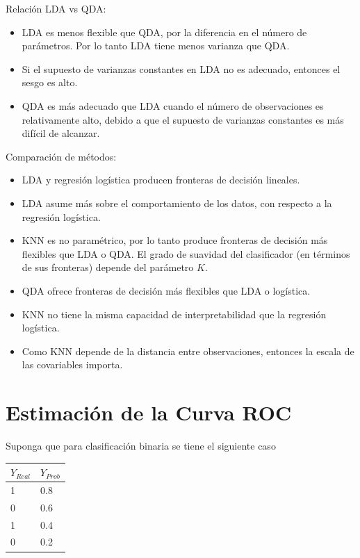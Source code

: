 \documentclass[
  12pt,
]{book}
\providecommand{\tightlist}{%
  \setlength{\itemsep}{0pt}\setlength{\parskip}{0pt}}
\begin{document}
Relación LDA vs QDA:

\begin{itemize}
\tightlist
\item
  LDA es menos flexible que QDA, por la diferencia en el número de
  parámetros. Por lo tanto LDA tiene menos varianza que QDA.
\item
  Si el supuesto de varianzas constantes en LDA no es adecuado, entonces
  el sesgo es alto.
\item
  QDA es más adecuado que LDA cuando el número de observaciones es
  relativamente alto, debido a que el supuesto de varianzas constantes
  es más difícil de alcanzar.
\end{itemize}

Comparación de métodos:

\begin{itemize}
\tightlist
\item
  LDA y regresión logística producen fronteras de decisión lineales.
\item
  LDA asume más sobre el comportamiento de los datos, con respecto a la
  regresión logística.
\item
  KNN es no paramétrico, por lo tanto produce fronteras de decisión más
  flexibles que LDA o QDA. El grado de suavidad del clasificador (en
  términos de sus fronteras) depende del parámetro \(K\).
\item
  QDA ofrece fronteras de decisión más flexibles que LDA o logística.
\item
  KNN no tiene la misma capacidad de interpretabilidad que la regresión
  logística.
\item
  Como KNN depende de la distancia entre observaciones, entonces la
  escala de las covariables importa.
\end{itemize}

\hypertarget{estimaciuxf3n-de-la-curva-roc}{%
\section{Estimación de la Curva
ROC}\label{estimaciuxf3n-de-la-curva-roc}}

Suponga que para clasificación binaria se tiene el siguiente caso

\begin{longtable}[]{@{}ll@{}}
\toprule()
\(Y_{Real}\) & \(Y_{Prob}\) \\
\midrule()
\endhead
1 & 0.8 \\
0 & 0.6 \\
1 & 0.4 \\
0 & 0.2 \\
\bottomrule()
\end{longtable}
\end{document}
